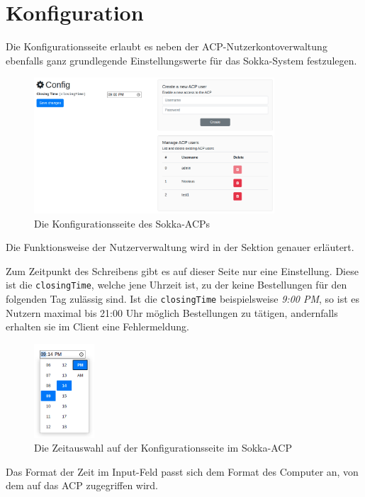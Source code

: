 \section{Konfiguration}

Die Konfigurationsseite erlaubt es neben der ACP-Nutzerkontoverwaltung ebenfalls ganz grundlegende Einstellungswerte für das Sokka-System festzulegen.

\begin{figure}[ht]
    \centering
    \includegraphics[width=0.8\textwidth]{images/ACP/config.png}
    \caption{Die Konfigurationsseite des Sokka-ACPs}
\end{figure}

Die Funktionsweise der Nutzerverwaltung wird in der Sektion \textit{} genauer erläutert.

Zum Zeitpunkt des Schreibens gibt es auf dieser Seite nur eine Einstellung. Diese ist die \lstinline{closingTime}, welche jene Uhrzeit ist, zu der keine Bestellungen für den folgenden Tag zulässig sind. Ist die \lstinline{closingTime} beispielsweise \textit{9:00 PM}, so ist es Nutzern maximal bis 21:00 Uhr möglich Bestellungen zu tätigen, andernfalls erhalten sie im Client eine Fehlermeldung.

\begin{figure}[ht]
    \centering
    \includegraphics[width=0.2\textwidth]{images/ACP/config_date.png}
    \caption{Die Zeitauswahl auf der Konfigurationsseite im Sokka-ACP}
\end{figure}

Das Format der Zeit im Input-Feld passt sich dem Format des Computer an, von dem auf das ACP zugegriffen wird.